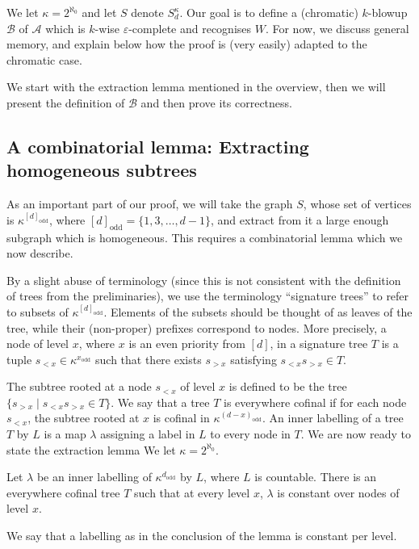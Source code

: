 \documentclass[a4paper,UKenglish,cleveref, thm-restate]{lipics-v2021}
\newcommand{\eps}{\varepsilon}
\newcommand{\odd}{\mathrm{odd}}
\newcommand{\A}{\mathcal{A}}
\newcommand{\B}{\mathcal B}
\renewcommand{\d}{[d]}
\begin{document}
\existenceEpsComplete*

We let $\kappa=2^{\aleph_0}$ and let $S$ denote $S_d^\kappa$.
Our goal is to define a (chromatic) $k$-blowup $\B$ of $\A$ which is $k$-wise $\eps$-complete and recognises $W$.
For now, we discuss general memory, and explain below how the proof is (very easily) adapted to the chromatic case.

We start with the extraction lemma mentioned in the overview, then we will present the definition of $\B$ and then prove its correctness.

\subsection{A combinatorial lemma: Extracting homogeneous subtrees}

As an important part of our proof, we will take the graph $S$, whose set of vertices is $\kappa^{\d_\odd}$, where $\d_\odd=\{1,3,\dots,d-1\}$, and extract from it a large enough subgraph which is homogeneous.
This requires a combinatorial lemma which we now describe.

By a slight abuse of terminology (since this is not consistent with the definition of trees from the preliminaries), we use the terminology ``signature trees'' to refer to subsets of $\kappa^{\d_\odd}$.
Elements of the subsets should be thought of as leaves of the tree, while their (non-proper) prefixes correspond to nodes.
More precisely, a node of level $x$, where $x$ is an even priority from $\d$, in a signature tree $T$ is a tuple $s_{< x} \in \kappa^{x_\odd}$ such that there exists $s_{> x}$ satisfying $s_{< x} s_{> x} \in T$.

The subtree rooted at a node $s_{<x}$ of level $x$ is defined to be the tree $\{s_{>x} \mid s_{<x}s_{>x} \in T\}$.
We say that a tree $T$ is everywhere cofinal if for each node $s_{< x}$, the subtree rooted at $x$ is cofinal in $\kappa^{(d-x)_\odd}$.
An inner labelling of a tree $T$ by $L$ is a map $\lambda$ assigning a label in $L$ to every node in $T$.
We are now ready to state the extraction lemma
We let $\kappa=2^{\aleph_0}$.

\begin{lemma}\label{lem:everywhere_cofinal}
Let $\lambda$ be an inner labelling of $\kappa^{d_\odd}$ by $L$, where $L$ is countable.
There is an everywhere cofinal tree $T$ such that at every level $x$, $\lambda$ is constant over nodes of level $x$.
\end{lemma}
We say that a labelling as in the conclusion of the lemma is constant per level.
\end{document}
